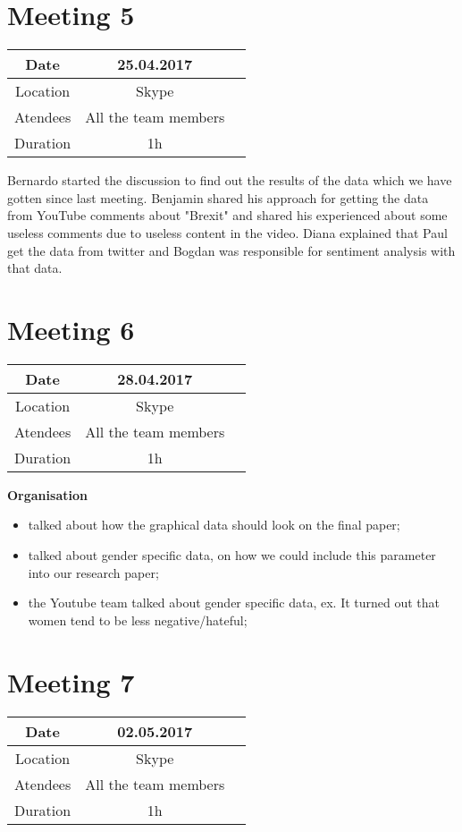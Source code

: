 \section{Meeting 5}
\begin{center}
	\begin{tabular}{| c | c | c }
		\hline
		Date & 	25.04.2017   \\
		\hline
		Location & Skype  \\
		\hline
		Atendees & All the team members   \\
		\hline
		Duration & 1h  \\
		\hline
	\end{tabular}
\end{center}


Bernardo started the discussion to find out the results of the
data which we have gotten since last meeting. Benjamin
shared his approach for getting the data from YouTube
comments about "Brexit" and shared his experienced about
some useless comments due to useless content in the video.
Diana explained that Paul get the data from twitter and
Bogdan was responsible for sentiment analysis with that data.

\section{Meeting 6}
\begin{center}
	\begin{tabular}{| c | c | c }
		\hline
		Date & 	28.04.2017   \\
		\hline
		Location & Skype  \\
		\hline
		Atendees & All the team members   \\
		\hline
		Duration & 1h  \\
		\hline
	\end{tabular}
\end{center}
 \textbf{Organisation}
 \begin{itemize}
	\item talked about how the graphical data should look on the final paper;
	\item talked about gender specific data, on how we could include this parameter into our research paper;
	\item the Youtube team talked about gender specific data, ex. It turned out that women tend to be less negative/hateful;
 \end{itemize}


\section{Meeting 7}
\begin{center}
	\begin{tabular}{| c | c | c }
		\hline
		Date &	02.05.2017   \\
		\hline
		Location & Skype  \\
		\hline
		Atendees & All the team members   \\
		\hline
		Duration & 1h  \\
		\hline
	\end{tabular}
\end{center}


